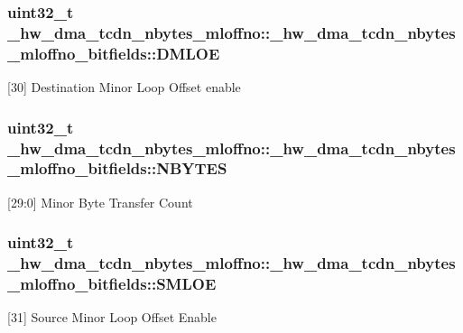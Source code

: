 \subsubsection[{\texorpdfstring{D\+M\+L\+OE}{DMLOE}}]{\setlength{\rightskip}{0pt plus 5cm}uint32\+\_\+t \+\_\+hw\+\_\+dma\+\_\+tcdn\+\_\+nbytes\+\_\+mloffno\+::\+\_\+hw\+\_\+dma\+\_\+tcdn\+\_\+nbytes\+\_\+mloffno\+\_\+bitfields\+::\+D\+M\+L\+OE}\hypertarget{struct__hw__dma__tcdn__nbytes__mloffno_1_1__hw__dma__tcdn__nbytes__mloffno__bitfields_a0bbb5bc763cc0a64961f8ee5de6b1cc4}{}\label{struct__hw__dma__tcdn__nbytes__mloffno_1_1__hw__dma__tcdn__nbytes__mloffno__bitfields_a0bbb5bc763cc0a64961f8ee5de6b1cc4}
\mbox{[}30\mbox{]} Destination Minor Loop Offset enable 
\subsubsection[{\texorpdfstring{N\+B\+Y\+T\+ES}{NBYTES}}]{\setlength{\rightskip}{0pt plus 5cm}uint32\+\_\+t \+\_\+hw\+\_\+dma\+\_\+tcdn\+\_\+nbytes\+\_\+mloffno\+::\+\_\+hw\+\_\+dma\+\_\+tcdn\+\_\+nbytes\+\_\+mloffno\+\_\+bitfields\+::\+N\+B\+Y\+T\+ES}\hypertarget{struct__hw__dma__tcdn__nbytes__mloffno_1_1__hw__dma__tcdn__nbytes__mloffno__bitfields_a49d2062687bc5e3f7b420d8bb3d3b388}{}\label{struct__hw__dma__tcdn__nbytes__mloffno_1_1__hw__dma__tcdn__nbytes__mloffno__bitfields_a49d2062687bc5e3f7b420d8bb3d3b388}
\mbox{[}29\+:0\mbox{]} Minor Byte Transfer Count 
\subsubsection[{\texorpdfstring{S\+M\+L\+OE}{SMLOE}}]{\setlength{\rightskip}{0pt plus 5cm}uint32\+\_\+t \+\_\+hw\+\_\+dma\+\_\+tcdn\+\_\+nbytes\+\_\+mloffno\+::\+\_\+hw\+\_\+dma\+\_\+tcdn\+\_\+nbytes\+\_\+mloffno\+\_\+bitfields\+::\+S\+M\+L\+OE}\hypertarget{struct__hw__dma__tcdn__nbytes__mloffno_1_1__hw__dma__tcdn__nbytes__mloffno__bitfields_acc780c9d7d8137dff477592b8c03a15d}{}\label{struct__hw__dma__tcdn__nbytes__mloffno_1_1__hw__dma__tcdn__nbytes__mloffno__bitfields_acc780c9d7d8137dff477592b8c03a15d}
\mbox{[}31\mbox{]} Source Minor Loop Offset Enable 

